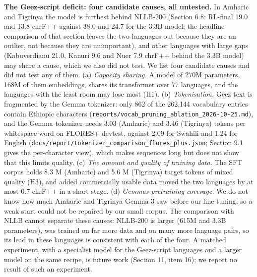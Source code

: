 \textbf{The Ge\textquotesingle ez-script deficit: four candidate causes, all untested.} In Amharic and Tigrinya the model is furthest behind NLLB-200 (Section 6.8: RL-final 19.0 and 13.8 chrF++ against 38.0 and 24.7 for the 3.3B model; the headline comparison of that section leaves the two languages out because they are an outlier, not because they are unimportant), and other languages with large gaps (Kabuverdianu 21.0, Kanuri 9.6 and Nuer 7.9 chrF++ behind the 3.3B model) may share a cause, which we also did not test. We list four candidate causes and did not test any of them. (a) \emph{Capacity sharing.} A model of 270M parameters, 168M of them embeddings, shares its transformer over 77 languages, and the languages with the least room may lose most (H1). (b) \emph{Tokenisation.} Ge\textquotesingle ez text is fragmented by the Gemma tokenizer: only 862 of the 262,144 vocabulary entries contain Ethiopic characters (\texttt{reports/vocab\_pruning\_ablation\_2026-10-25.md}), and the Gemma tokenizer needs 3.03 (Amharic) and 3.46 (Tigrinya) tokens per whitespace word on FLORES+ devtest, against 2.09 for Swahili and 1.24 for English (\texttt{docs/report/tokenizer\_comparison\_flores\_plus.json}; Section 9.1 gives the per-character view), which makes sequences long but does not show that this limits quality. (c) \emph{The amount and quality of training data.} The SFT corpus holds 8.3 M (Amharic) and 5.6 M (Tigrinya) target tokens of mixed quality (H3), and added commercially usable data moved the two languages by at most 0.7 chrF++ in a short stage. (d) \emph{Gemma\textquotesingle s pretraining coverage.} We do not know how much Amharic and Tigrinya Gemma 3 saw before our fine-tuning, so a weak start could not be repaired by our small corpus. The comparison with NLLB cannot separate these causes: NLLB-200 is larger (615M and 3.3B parameters), was trained on far more data and on many more language pairs, so its lead in these languages is consistent with each of the four. A matched experiment, with a specialist model for the Ge\textquotesingle ez-script languages and a larger model on the same recipe, is future work (Section 11, item 16); we report no result of such an experiment.


